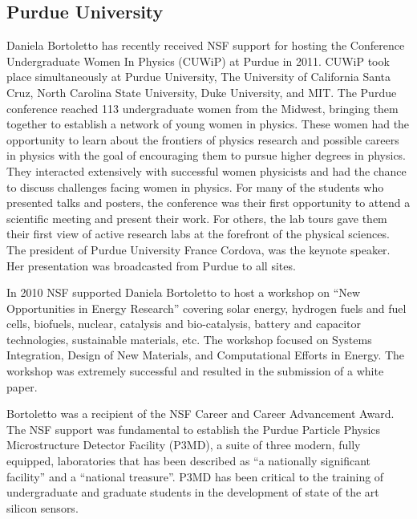 
\subsection{Purdue University}

Daniela Bortoletto has recently received NSF support for hosting the
Conference Undergraduate Women In Physics (CUWiP) at Purdue in
2011. CUWiP took place simultaneously at Purdue University, The
University of California Santa Cruz, North Carolina State University,
Duke University, and MIT. The Purdue conference reached 113
undergraduate women from the Midwest, bringing them together to
establish a network of young women in physics. These women had the
opportunity to learn about the frontiers of physics research and
possible careers in physics with the goal of encouraging them to
pursue higher degrees in physics. They interacted extensively with
successful women physicists and had the chance to discuss challenges
facing women in physics. For many of the students who presented talks
and posters, the conference was their first opportunity to attend a
scientific meeting and present their work. For others, the lab tours
gave them their first view of active research labs at the forefront of
the physical sciences. The president of Purdue University France
Cordova, was the keynote speaker. Her presentation was broadcasted
from Purdue to all sites.

In 2010 NSF supported Daniela Bortoletto to host a workshop on “New
Opportunities in Energy Research” covering solar energy, hydrogen
fuels and fuel cells, biofuels, nuclear, catalysis and bio-catalysis,
battery and capacitor technologies, sustainable materials, etc. The
workshop focused on Systems Integration, Design of New Materials, and
Computational Efforts in Energy. The workshop was extremely successful
and resulted in the submission of a white paper.

Bortoletto was a recipient of the NSF Career and Career Advancement
Award. The NSF support was fundamental to establish the Purdue
Particle Physics Microstructure Detector Facility (P3MD), a suite of
three modern, fully equipped, laboratories that has been described as
“a nationally significant facility” and a “national treasure”. P3MD
has been critical to the training of undergraduate and graduate
students in the development of state of the art silicon sensors.

